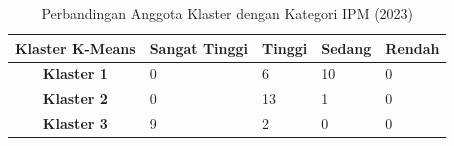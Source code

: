\begin{table}[H]
\centering
\caption{Perbandingan Anggota Klaster dengan Kategori IPM (2023)} \label{tab:ipm_cross_2023}
\begin{tabular}{|c|p{2cm}|p{2cm}|p{2cm}|p{2cm}|}
\hline
\textbf{Klaster K-Means} & \textbf{Sangat Tinggi} & \textbf{Tinggi} & \textbf{Sedang} & \textbf{Rendah} \\ \hline
\textbf{Klaster 1} & 0 & 6 & 10 & 0 \\ \hline
\textbf{Klaster 2} & 0 & 13 & 1 & 0 \\ \hline
\textbf{Klaster 3} & 9 & 2 & 0 & 0 \\ \hline
\end{tabular}
\end{table}
